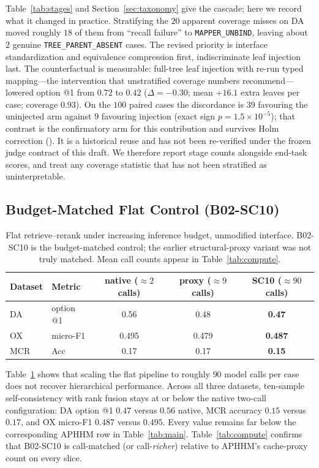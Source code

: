 Table~\ref{tab:stages} and Section~\ref{sec:taxonomy} give the cascade; here we record what it changed in practice.
Stratifying the $20$ apparent coverage misses on DA moved roughly $18$ of them from ``recall failure'' to \texttt{MAPPER\_UNBIND}, leaving about $2$ genuine \texttt{TREE\_PARENT\_ABSENT} cases.
The revised priority is interface standardization and equivalence compression first, indiscriminate leaf injection last.
The counterfactual is measurable: full-tree leaf injection with re-run typed mapping---the intervention that unstratified coverage numbers recommend---lowered option @1 from $0.72$ to $0.42$ ($\Delta{=}{-}0.30$; mean ${+}16.1$ extra leaves per case; coverage $0.93$).
On the $100$ paired cases the discordance is $39$ favouring the uninjected arm against $9$ favouring injection (exact sign $p{=}1.5{\times}10^{-5}$); that contrast is the confirmatory arm for this contribution and survives Holm correction ().
It is a historical reuse and has not been re-verified under the frozen judge contract of this draft.
We therefore report stage counts alongside end-task scores, and treat any coverage statistic that has not been stratified as uninterpretable.

\subsection{Budget-Matched Flat Control (B02-SC10)}
\label{sec:rq4}

\begin{table}[t]
\centering
\small
\caption{Flat retrieve--rerank under increasing inference budget, unmodified interface. B02-SC10 is the budget-matched control; the earlier structural-proxy variant was not truly matched. Mean call counts appear in Table~\ref{tab:compute}.}
\label{tab:budget}
\begin{tabular}{llccc}
\toprule
Dataset & Metric & native ($\approx2$ calls) & proxy ($\approx9$ calls) & \textbf{SC10} ($\approx90$ calls) \\
\midrule
DA & option @1 & 0.56 & 0.48 & \textbf{0.47} \\
OX & micro-F1 & 0.495 & 0.479 & \textbf{0.487} \\
MCR & Acc & 0.17 & 0.17 & \textbf{0.15} \\
\bottomrule
\end{tabular}
\end{table}

Table~\ref{tab:budget} shows that scaling the flat pipeline to roughly $90$ model calls per case does not recover hierarchical performance.
Across all three datasets, ten-sample self-consistency with rank fusion stays at or below the native two-call configuration: DA option @1 $0.47$ versus $0.56$ native, MCR accuracy $0.15$ versus $0.17$, and OX micro-F1 $0.487$ versus $0.495$.
Every value remains far below the corresponding APHHM row in Table~\ref{tab:main}.
Table~\ref{tab:compute} confirms that B02-SC10 is call-matched (or call-\emph{richer}) relative to APHHM's cache-proxy count on every slice.

